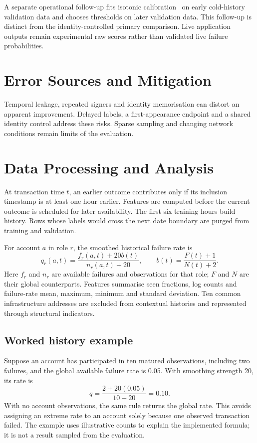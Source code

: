\documentclass[12pt,a4paper,oneside]{report}
\begin{document}
A separate operational follow-up fits isotonic calibration~\cite{isotonic,niculescu} on early cold-history validation data and chooses thresholds on later validation data. This follow-up is distinct from the identity-controlled primary comparison. Live application outputs remain experimental raw scores rather than validated live failure probabilities.

\section{Error Sources and Mitigation}
Temporal leakage, repeated signers and identity memorisation can distort an apparent improvement. Delayed labels, a first-appearance endpoint and a shared identity control address these risks. Sparse sampling and changing network conditions remain limits of the evaluation.

\section{Data Processing and Analysis}
At transaction time $t$, an earlier outcome contributes only if its inclusion timestamp is at least one hour earlier. Features are computed before the current outcome is scheduled for later availability. The first six training hours build history. Rows whose labels would cross the next date boundary are purged from training and validation.

For account $a$ in role $r$, the smoothed historical failure rate is
\begin{equation}q_r(a,t)=\frac{f_r(a,t)+20b(t)}{n_r(a,t)+20},\qquad b(t)=\frac{F(t)+1}{N(t)+2}.\end{equation}
Here $f_r$ and $n_r$ are available failures and observations for that role; $F$ and $N$ are their global counterparts. Features summarise seen fractions, log counts and failure-rate mean, maximum, minimum and standard deviation. Ten common infrastructure addresses are excluded from contextual histories and represented through structural indicators.

\subsection{Worked history example}
Suppose an account has participated in ten matured observations, including two failures, and the global available failure rate is 0.05. With smoothing strength 20, its rate is
\begin{equation}q=\frac{2+20(0.05)}{10+20}=0.10.\end{equation}
With no account observations, the same rule returns the global rate. This avoids assigning an extreme rate to an account solely because one observed transaction failed. The example uses illustrative counts to explain the implemented formula; it is not a result sampled from the evaluation.
\end{document}
